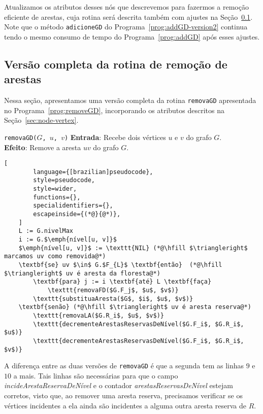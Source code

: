 Atualizamos os atributos desses nós que descrevemos para fazermos a remoção eficiente de arestas, cuja rotina será descrita também com ajustes na Seção~\ref{sec:code-edge-removal-second-version}. Note que o método \texttt{adicioneGD} do Programa~\ref{prog:addGD-version2} continua tendo o mesmo consumo de tempo do Programa~\ref{prog:addGD} após esses ajustes. 

\subsection{Versão completa da rotina de remoção de arestas}
\label{sec:code-edge-removal-second-version}

Nessa seção, apresentamos uma versão completa da rotina \texttt{removaGD} apresentada no Programa~\ref{prog:removeGD}, incorporando os atributos descritos na Seção~\ref{sec:node-vertex}. 

\begin{programruledcaption}{\texttt{removaGD($G$, $u$, $v$)} \label{prog:removeGD-version2}}
    \noindent\textbf{Entrada}: Recebe dois vértices $u$ e $v$ do grafo $G$. \\
    \noindent\textbf{Efeito}: Remove a aresta $uv$ do grafo $G$. 
    \vspace{-0.5\baselineskip}
    \begin{lstlisting}[
        language={[brazilian]pseudocode},
        style=pseudocode,
        style=wider,
        functions={},
        specialidentifiers={},
        escapeinside={(*@}{@*)},
    ]
    L := G.nivelMax
    i := G.$\emph{nível[u, v]}$
    $\emph{nível[u, v]}$ := \texttt{NIL} (*@\hfill $\triangleright$ marcamos uv como removida@*)
    \textbf{se} uv $\in$ G.$F_{L}$ \textbf{então}  (*@\hfill $\triangleright$ uv é aresta da floresta@*)
        \textbf{para} j := i \textbf{até} L \textbf{faça}
            \texttt{removaFD($G.F_j$, $u$, $v$)}
        \texttt{substituaAresta($G$, $i$, $u$, $v$)}
    \textbf{senão} (*@\hfill $\triangleright$ uv é aresta reserva@*)
        \texttt{removaLA($G.R_i$, $u$, $v$)}
        \texttt{decrementeArestasReservasDeNível($G.F_i$, $G.R_i$, $u$)}
        \texttt{decrementeArestasReservasDeNível($G.F_i$, $G.R_i$, $v$)}
    \end{lstlisting}
    \vspace{-0.5\baselineskip}
\end{programruledcaption}

A diferença entre as duas versões de \texttt{removaGD} é que a segunda tem as linhas $9$ e $10$ a mais. Tais linhas são necessárias para que o campo \textit{incideArestaReservaDeNível} e o contador \textit{arestasReservasDeNível} estejam corretos, visto que, ao remover uma aresta reserva, precisamos verificar se os vértices incidentes a ela ainda são incidentes a alguma outra aresta reserva de $R$.  

